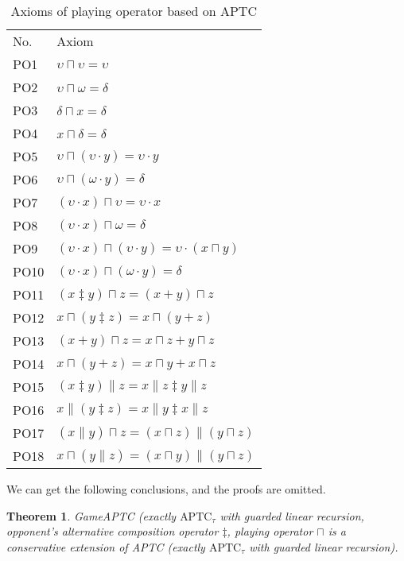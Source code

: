 \documentclass{fac}
\newtheorem{theorem}{Theorem}[section]
\begin{document}
\begin{center}
\begin{table}
  \begin{tabular}{@{}ll@{}}
  \hline No. &Axiom\\
  PO1 & $\upsilon \sqcap \upsilon = \upsilon$ \\
  PO2 & $\upsilon \sqcap \omega = \delta$ \\
  PO3 & $\delta \sqcap x = \delta$ \\
  PO4 & $x \sqcap \delta = \delta$ \\
  PO5 & $\upsilon \sqcap (\upsilon\cdot y) = \upsilon\cdot y$ \\
  PO6 & $\upsilon \sqcap (\omega\cdot y) = \delta$\\
  PO7 & $(\upsilon \cdot x)\sqcap \upsilon = \upsilon\cdot x$\\
  PO8 & $(\upsilon \cdot x)\sqcap \omega = \delta$\\
  PO9 & $(\upsilon \cdot x)\sqcap (\upsilon\cdot y) = \upsilon\cdot(x\sqcap y)$\\
  PO10 & $(\upsilon \cdot x)\sqcap (\omega\cdot y) = \delta$\\
  PO11 & $(x\ddagger y)\sqcap z = (x + y)\sqcap z$\\
  PO12 & $x\sqcap (y\ddagger z) = x\sqcap (y + z)$\\
  PO13 & $(x+ y)\sqcap z = x\sqcap z + y\sqcap z$\\
  PO14 & $x\sqcap (y + z) = x\sqcap y + x\sqcap z$\\
  PO15 & $(x\ddagger y)\parallel z = x\parallel z\ddagger y\parallel z$\\
  PO16 & $x\parallel (y\ddagger z)=x\parallel y\ddagger x\parallel z$\\
  PO17 & $(x\parallel y)\sqcap z = (x\sqcap z)\parallel (y\sqcap z)$\\
  PO18 & $x\sqcap(y\parallel z)=(x\sqcap y)\parallel (y\sqcap z)$\\
\end{tabular}
\caption{Axioms of playing operator based on APTC}
\label{AxiomOfPOAPTC}
\end{table}
\end{center}

We can get the following conclusions, and the proofs are omitted.

\begin{theorem}
GameAPTC (exactly $\textrm{APTC}_\tau$ with guarded linear recursion, opponent's alternative composition operator $\ddagger$, playing operator $\sqcap$ is a conservative extension of APTC (exactly $\textrm{APTC}_\tau$ with guarded linear recursion).
\end{theorem}
\end{document}
